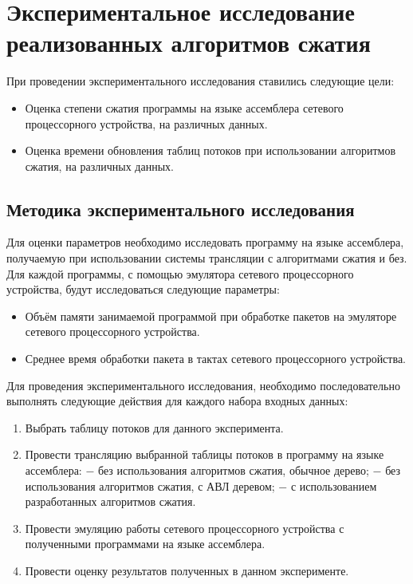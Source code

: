 \documentclass[oneside,final,12pt]{extarticle}
\begin{document}
    \section{Экспериментальное исследование реализованных алгоритмов сжатия}
        При проведении экспериментального исследования ставились следующие цели:
        \begin{itemize}
            \item Оценка степени сжатия программы на языке ассемблера сетевого процессорного устройства, на различных данных.
            \item Оценка времени обновления таблиц потоков при использовании алгоритмов сжатия, на различных данных.
        \end{itemize}
        \subsection{Методика экспериментального исследования}
            Для оценки параметров необходимо исследовать программу на языке ассемблера, получаемую при использовании
            системы трансляции с алгоритмами сжатия и без. Для каждой программы, с помощью эмулятора сетевого процессорного устройства,
            будут исследоваться следующие параметры:
            \begin{itemize}
                \item Объём памяти занимаемой программой при обработке пакетов на эмуляторе сетевого процессорного устройства.
                \item Среднее время обработки пакета в тактах сетевого процессорного устройства.
            \end{itemize}
            
            Для проведения экспериментального исследования, необходимо последовательно выполнять следующие действия для каждого набора входных данных:
            \begin{enumerate}
                \item Выбрать таблицу потоков для данного эксперимента.
                \item Провести трансляцию выбранной таблицы потоков в программу на языке ассемблера:
                    \subitem $-$ без использования алгоритмов сжатия, обычное дерево;
                    \subitem $-$ без использования алгоритмов сжатия, с АВЛ деревом;
                    \subitem $-$ с использованием разработанных алгоритмов сжатия.
                \item Провести эмуляцию работы сетевого процессорного устройства с полученными программами на языке ассемблера.
                \item Провести оценку результатов полученных в данном эксперименте.
            \end{enumerate}
\end{document}
